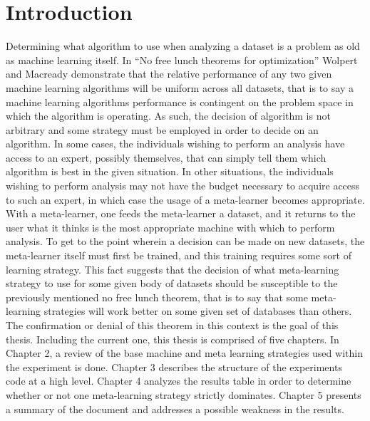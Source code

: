 \chapter{Introduction}
\label{Introduction}
Determining what algorithm to use when analyzing a dataset is a problem as
old as machine learning itself. In ``No free lunch theorems for optimization''
Wolpert and Macready demonstrate that the relative performance of any two given
machine learning algorithms will be uniform across all datasets, that is to say
a machine learning algorithms performance is contingent on the problem space in
which the algorithm is operating. As such, the decision of algorithm is not
arbitrary and some strategy must be employed in order to decide
on an algorithm. In some cases, the individuals wishing to perform an analysis
have access to an expert, possibly themselves, that can simply tell them which
algorithm is best in the given situation. In other situations, the individuals
wishing to perform analysis may not have the budget necessary to acquire access
to such an expert, in which case the usage of a meta-learner becomes appropriate.
With a meta-learner, one feeds the meta-learner a dataset, and it returns to the
user what it thinks is the most appropriate machine with which to perform
analysis. To get to the point wherein a decision can be made on new datasets, the
meta-learner itself must first be trained, and this training requires some
sort of learning strategy. This fact suggests that the decision of what
meta-learning strategy to use for some given body of datasets should be
susceptible to the previously mentioned no free lunch theorem, that is to say
that some meta-learning strategies will work better on some given set of
databases than others. The confirmation or denial of this theorem in this
context is the goal of this thesis. Including the current one, this thesis is
comprised of five chapters. In Chapter 2, a review of the base machine and meta
learning strategies used within the experiment is done. Chapter 3 describes the
structure of the experiments code at a high level. Chapter 4 analyzes the
results table in order to determine whether or not one meta-learning strategy
strictly dominates. Chapter 5 presents a summary of the document and addresses a
possible weakness in the results.

\pagebreak
